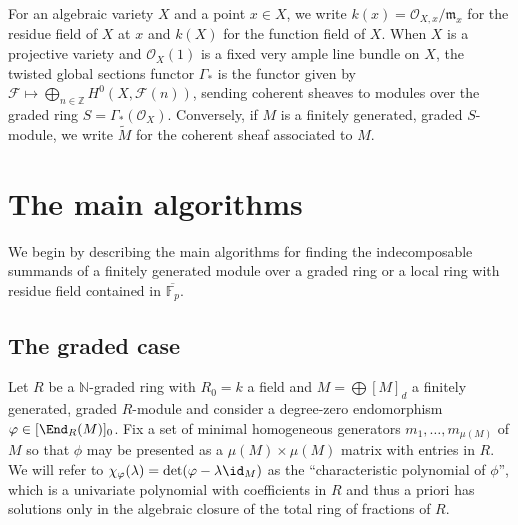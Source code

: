 \documentclass[12pt]{amsart}
\let\wtilde\widetilde
\def\cF{\mathcal F}
\def\OO{\mathcal O}
\def\FF{\mathbb F}
\def\ZZ{\mathbb Z}
\def\NN{\mathbb N}
\def\m{\mathfrak m}
\theoremstyle{theorem}
\numberwithin{thm}{section}
\theoremstyle{definition}
\begin{document}
For an algebraic variety $X$ and a point $x\in X$, we write $k(x)=\OO_{X,x}/\m_x$ for the residue field of $X$ at $x$ and $k(X)$ for the function field of $X$.
%
When $X$ is a projective variety and $\OO_X(1)$ is a fixed very ample line bundle on $X$, the twisted global sections functor $\Gamma_*$ is the functor given by $\cF \mapsto \bigoplus_{n\in\ZZ} H^0(X, \cF(n))$, sending coherent sheaves to modules over the graded ring $S = \Gamma_*(\OO_X)$. Conversely, if $M$ is a finitely generated, graded $S$-module, we write $\wtilde M$ for the coherent sheaf associated to $M$.

\section{The main algorithms}

We begin by describing the main algorithms for finding the indecomposable summands of a finitely generated module over a graded ring or a local ring with residue field contained in $\overline{\FF_p}$.

\subsection{The graded case}\label{sec:graded-alg}

Let $R$ be a $\NN$-graded ring with $R_0 = k$ a field and $M = \bigoplus [M]_d$ a finitely generated, graded $R$-module and consider a degree-zero endomorphism $\phi \in [\End_R(M)]_0$. Fix a set of minimal homogeneous generators $m_1,\dots,m_{\mu(M)}$ of $M$ so that $\phi$ may be presented as a $\mu(M)\times\mu(M)$ matrix with entries in $R$. We will refer to $\chi_\phi(\lambda) = \det(\phi-\lambda\id_M)$ as the ``characteristic polynomial of $\phi$'', which is a univariate polynomial with coefficients in $R$ and thus a priori has solutions only in the algebraic closure of the total ring of fractions of $R$.
\end{document}
